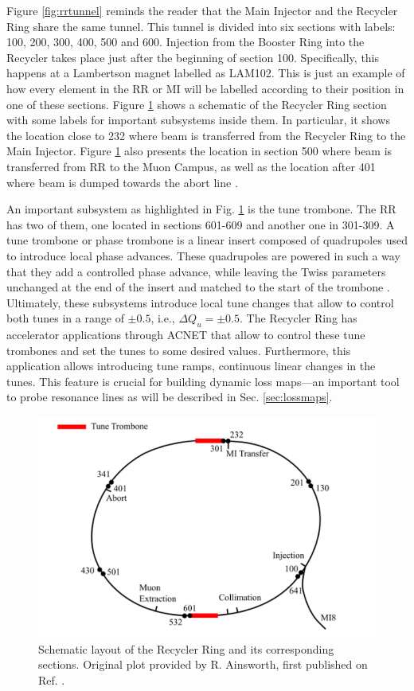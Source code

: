 Figure \ref{fig:rrtunnel} reminds the reader that the Main Injector and the Recycler Ring share the same tunnel. This tunnel is divided into six sections with labels: 100, 200, 300, 400, 500 and 600. Injection from the Booster Ring into the Recycler takes place just after the beginning of section 100. Specifically, this happens at a Lambertson magnet labelled as LAM102. This is just an example of how every element in the RR or MI will be labelled according to their position in one of these sections. Figure \ref{fig:rrschematic} shows a schematic of the Recycler Ring section with some labels for important subsystems inside them. In particular, it shows the location close to 232 where beam is transferred from the Recycler Ring to the Main Injector. Figure \ref{fig:rrschematic} also presents the location in section 500 where beam is transferred from RR to the Muon Campus, as well as the location after 401 where beam is dumped towards the abort line \cite{rr1,fermi_rookie}.

An important subsystem as highlighted in Fig. \ref{fig:rrschematic} is the tune trombone. The RR has two of them, one located in sections 601-609 and another one in 301-309. A tune trombone or phase trombone is a linear insert composed of quadrupoles used to introduce local phase advances. These quadrupoles are powered in such a way that they add a controlled phase advance, while leaving the Twiss parameters unchanged at the end of the insert and matched to the start of the trombone \cite{trombone,rr0}. Ultimately, these subsystems introduce local tune changes that allow to control both tunes in a range of $\pm 0.5$, i.e., $\Delta Q_u = \pm 0.5$. The Recycler Ring has accelerator applications through ACNET that allow to control these tune trombones and set the tunes to some desired values. Furthermore, this application allows introducing tune ramps, continuous linear changes in the tunes. This feature is crucial for building dynamic loss maps---an important tool to probe resonance lines as will be described in Sec. \ref{sec:lossmaps}.    

\begin{figure}[H]
   \centering
   \includegraphics[width=\columnwidth]{chapter3/RRschematic.png}
   \caption{Schematic layout of the Recycler Ring and its corresponding sections. Original plot provided by R. Ainsworth, first published on Ref. \cite{rr1}.}
   \label{fig:rrschematic}
\end{figure}

